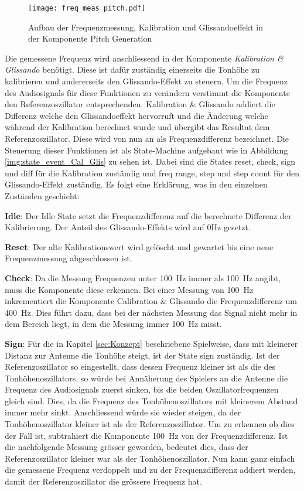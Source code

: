 \begin{figure}[h!]
	\centering
	\texttt{[image: freq\_meas\_pitch.pdf]}
	\caption{Aufbau der Frequenzmessung, Kalibration und Glissandoeffekt in der Komponente Pitch Generation} 
	\label{img:freq_meas_pitch}
\end{figure}  

Die gemessene Frequenz wird anschliessend in der Komponente \textit{Kalibration \& Glissando} benötigt. Diese ist dafür zuständig einerseits die Tonhöhe zu kalibrieren und andererseits den Glissando-Effekt zu steuern. Um die Frequenz des Audiosignals für diese Funktionen zu verändern verstimmt die Komponente den Referenzoszillator entsprechenden. Kalibration \& Glissando addiert die Differenz welche den Glissandoeffekt hervorruft und die Änderung welche während der Kalibration berechnet wurde und übergibt das Resultat dem Referenzoszillator. Diese wird von nun an als Frequenzdifferenz bezeichnet. Die Steuerung dieser Funktionen ist als State-Machine aufgebaut wie in Abbildung \ref{img:state_event_Cal_Glis} zu sehen ist. 
Dabei sind die States reset, check, sign und diff für die Kalibration zuständig und freq range, step und step count für den Glissando-Effekt zuständig. Es folgt eine Erklärung, was in den einzelnen Zuständen geschieht:

\textbf{Idle}:
Der Idle State setzt die Frequenzdifferenz auf die berechnete Differenz der Kalibrierung. Der Anteil des Glissando-Effekts wird auf 0Hz gesetzt.

\textbf{Reset}:
Der alte Kalibrationswert wird gelöscht und gewartet bis eine neue Frequenzmessung abgeschlossen ist.

\textbf{Check}:
Da die Messung Frequenzen unter \SI{100}{Hz} immer als \SI{100}{Hz} angibt, muss die Komponente diese erkennen. Bei einer Messung von \SI{100}{Hz} inkrementiert die Komponente Calibration \& Glissando die Frequenzdifferenz um \SI{400}{Hz}. Dies führt dazu, dass bei der nächsten Messung das Signal nicht mehr in dem Bereich liegt, in dem die Messung immer \SI{100}{Hz} misst.

\textbf{Sign}:
Für die in Kapitel \ref{sec:Konzept} beschriebene Spielweise, dass mit kleinerer Distanz zur Antenne die Tonhöhe steigt, ist der State sign zuständig. Ist der Referenzoszillator so eingestellt, dass dessen Frequenz kleiner ist als die des Tonhöhenoszillators, so würde bei Annäherung des Spielers an die Antenne die Frequenz des Audiosignals zuerst sinken, bis die beiden Oszillatorfrequenzen gleich sind. Dies, da die Frequenz des Tonhöhenoszillators mit kleinerem Abstand immer mehr sinkt. Anschliessend würde sie wieder steigen, da der Tonhöhenoszillator kleiner ist als der Referenzoszillator. Um zu erkennen ob dies der Fall ist, subtrahiert die Komponente \SI{100}{Hz} von der Frequenzdifferenz. Ist die nachfolgende Messung grösser geworden, bedeutet dies, dass der Referenzoszillator kleiner war als der Tonhöhenoszillator. Nun kann ganz einfach die gemessene Frequenz verdoppelt und zu der Frequenzdifferenz addiert werden, damit der Referenzoszillator die grössere Frequenz hat.

